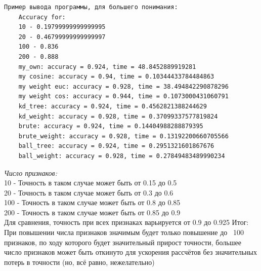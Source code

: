 \documentclass{article}
\begin{document}
\begin{verbatim}
Пример вывода программы, для большего понимания:
    Accuracy for: 
    10 - 0.19799999999999995
    20 - 0.46799999999999997
    100 - 0.836
    200 - 0.888
    my_own: accuracy = 0.924, time = 48.8452889919281
    my cosine: accuracy = 0.94, time = 0.10344433784484863
    my weight euc: accuracy = 0.928, time = 38.494842290878296
    my weight cos: accuracy = 0.944, time = 0.1073000431060791
    kd_tree: accuracy = 0.924, time = 0.4562821388244629
    kd_weight: accuracy = 0.928, time = 0.37099337577819824
    brute: accuracy = 0.924, time = 0.14404988288879395
    brute_weight: accuracy = 0.928, time = 0.13192200660705566
    ball_tree: accuracy = 0.924, time = 0.2951321601867676
    ball_weight: accuracy = 0.928, time = 0.27849483489990234
\end{verbatim}
 
\textit{\large Число признаков:} \\
10 - Точность в таком случае может быть от 0.15 до 0.5 \\
20 - Точность в таком случае может быть от 0.3 до 0.6 \\
100 - Точность в таком случае может быть от 0.8 до 0.85 \\
200 - Точность в таком случае может быть от 0.85 до 0.9 \\
Для сравнения, точность при всех признаках варьируется от 0.9 до 0.925
Итог: При повышении числа признаков значимым будет только повышение до ~100 признаков, по ходу которого будет значительный прирост точности, большее число признаков может быть откинуто для ускорения рассчётов без значительных потерь в точности (но, всё равно, нежелательно) \\
\end{document}
